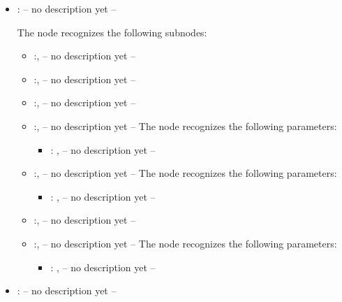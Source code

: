 \begin{itemize}
    \item {}:
      -- no description yet --

      The  node recognizes the following subnodes:
      \begin{itemize}
        \item {}:, 
          -- no description yet --

        \item {}:, 
          -- no description yet --

        \item {}:, 
          -- no description yet --

        \item {}:, 
          -- no description yet --
          The  node recognizes the following parameters:
            \begin{itemize}
              \item {}: , 
                -- no description yet --
          \end{itemize}

        \item {}:, 
          -- no description yet --
          The  node recognizes the following parameters:
            \begin{itemize}
              \item {}: , 
                -- no description yet --
          \end{itemize}

        \item {}:, 
          -- no description yet --

        \item {}:, 
          -- no description yet --
          The  node recognizes the following parameters:
            \begin{itemize}
              \item {}: , 
                -- no description yet --
          \end{itemize}
      \end{itemize}

    \item {}:
      -- no description yet --


\end{itemize}
